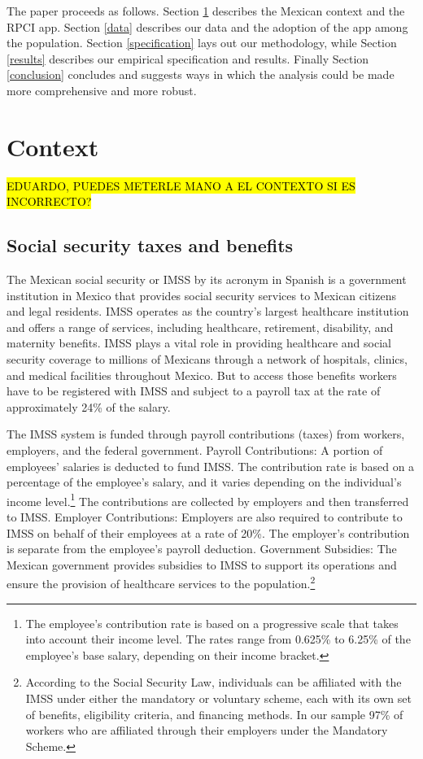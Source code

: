 \documentclass[oneside,11pt]{article}
\begin{document}
The paper proceeds as follows. Section \ref{context} describes the Mexican context and the RPCI app. Section \ref{data} describes our data and the adoption of the app among the population. Section \ref{specification} lays out our methodology, while Section \ref{results} describes our empirical specification and results. Finally Section \ref{conclusion} concludes and suggests ways in which the analysis could be made more comprehensive and more robust.


\section{Context} \label{context}

\vspace{.2in}
\hl{EDUARDO, PUEDES METERLE MANO A EL CONTEXTO SI ES INCORRECTO?}

\subsection{Social security taxes and benefits}

The Mexican social security  or IMSS by its acronym in Spanish is a government institution in Mexico that provides social security services to Mexican citizens and legal residents. IMSS operates as the country's largest healthcare institution and offers a range of services, including healthcare, retirement, disability, and maternity benefits. IMSS plays a vital role in providing healthcare and social security coverage to millions of Mexicans through a network of hospitals, clinics, and medical facilities throughout Mexico. But to access those benefits workers have to be registered with IMSS and subject to a payroll tax at the rate of approximately 24\% of the salary. 

The IMSS system is funded through payroll contributions (taxes) from workers, employers, and the federal government. Payroll Contributions: A portion of employees' salaries is deducted to fund IMSS. The contribution rate is based on a percentage of the employee's salary, and it varies depending on the individual's income level.\footnote{The employee's contribution rate is based on a progressive scale that takes into account their income level. The rates range from 0.625\% to 6.25\% of the employee's base salary, depending on their income bracket.} The contributions are collected by employers and then transferred to IMSS. Employer Contributions: Employers are also required to contribute to IMSS on behalf of their employees at a rate of 20\%. The employer's contribution is separate from the employee's payroll deduction. Government Subsidies: The Mexican government provides subsidies to IMSS to support its operations and ensure the provision of healthcare services to the population.\footnote{According to the Social Security Law, individuals can be affiliated with the IMSS under either the mandatory or voluntary scheme, each with its own set of benefits, eligibility criteria, and financing methods. In our sample 97\% of workers who are affiliated through their employers under the Mandatory Scheme.}
\end{document}
